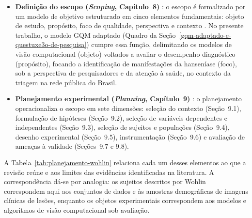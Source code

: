 \begin{itemize}
\item \textbf{Definição do escopo (\textit{Scoping}, Capítulo~8)} \cite[p.~109--114]{wohlin2024}:
o escopo é formalizado por um modelo de objetivo estruturado em cinco elementos fundamentais:
objeto de estudo, propósito, foco de qualidade, perspectiva e contexto \cite[p.~109--110]{wohlin2024}.
No presente trabalho, o modelo GQM adaptado (Quadro da Seção~\ref{gqm-adaptado-e-questuxe3o-de-pesquisa})
cumpre essa função, delimitando os modelos de visão computacional (objeto) voltados a avaliar o desempenho
diagnóstico (propósito), focando a identificação de manifestações da hanseníase (foco), sob a perspectiva
de pesquisadores e da atenção à saúde, no contexto da triagem na rede pública do Brasil.

\item \textbf{Planejamento experimental (\textit{Planning}, Capítulo~9)} \cite[p.~115--144]{wohlin2024}:
o planejamento operacionaliza o escopo em sete dimensões: seleção do contexto (Seção~9.1),
formulação de hipóteses (Seção~9.2), seleção de variáveis dependentes e independentes (Seção~9.3),
seleção de sujeitos e populações (Seção~9.4), desenho experimental (Seção~9.5), instrumentação
(Seção~9.6) e avaliação de ameaças à validade (Seções~9.7 e 9.8).
\end{itemize}

A Tabela~\ref{tab:planejamento-wohlin} relaciona cada um desses elementos ao que a revisão
reúne e aos limites das evidências identificadas na literatura. A correspondência dá-se por analogia:
os sujeitos descritos por Wohlin correspondem aqui aos conjuntos de dados e às amostras demográficas de imagens
clínicas de lesões, enquanto os objetos experimentais correspondem aos modelos e algoritmos de visão
computacional sob avaliação.

